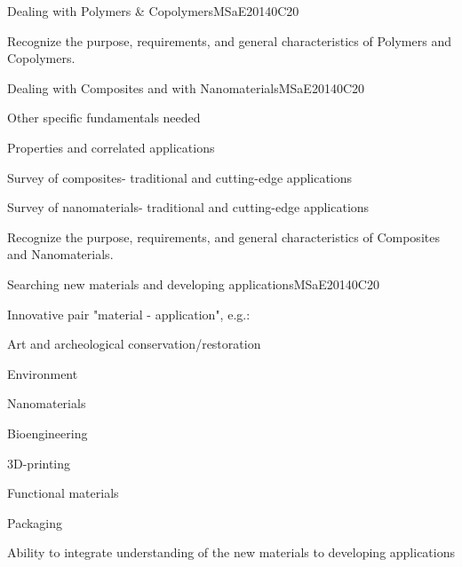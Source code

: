 \begin{syllabus}
\begin{unit}{Dealing with Polymers \& Copolymers}{}{MSaE2014}{0}{C20}
\begin{learningoutcomes}
      \item Recognize the purpose, requirements, and general characteristics of Polymers and Copolymers.
   \end{learningoutcomes}
\end{unit}

\begin{unit}{Dealing with Composites and with Nanomaterials}{}{MSaE2014}{0}{C20}
\begin{topics}
      \item Other specific fundamentals needed
      \item Properties and correlated applications
      \item Survey of composites- traditional and cutting-edge applications
      \item Survey of nanomaterials- traditional and cutting-edge applications
\end{topics}
   \begin{learningoutcomes}

      \item Recognize the purpose, requirements, and general characteristics of Composites and Nanomaterials.
   \end{learningoutcomes}
\end{unit}

\begin{unit}{Searching new materials and developing applications}{}{MSaE2014}{0}{C20}
\begin{topics}
      \item Innovative pair "material - application", e.g.:
	  \begin{subtopics}
	  \item  Art and archeological conservation/restoration
	  \item  Environment
	  \item  Nanomaterials
	  \item  Bioengineering
	  \item  3D-printing	
	  \item  Functional materials
	  \item  Packaging
	  \end{subtopics}  
\end{topics}
   \begin{learningoutcomes}
      \item Ability to integrate understanding of the new materials to developing applications
   \end{learningoutcomes}
\end{unit}





\begin{coursebibliography}
\end{coursebibliography}

\end{syllabus}

